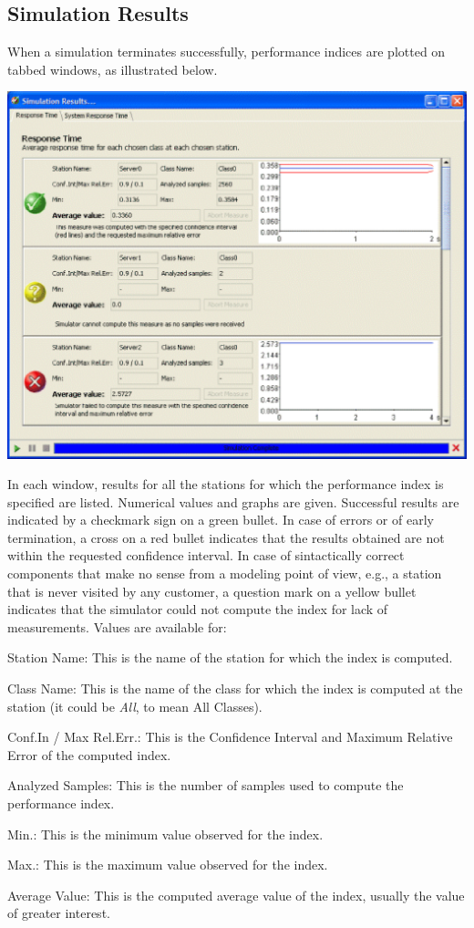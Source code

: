 \begin{description*}
\section{Simulation Results}
\label{sec:SimulationResults}
When a simulation terminates successfully, performance indices are plotted on tabbed windows, as illustrated below.
\begin{center}
\includegraphics[scale=.5]{img/jsim/sim_window.eps}
\end{center}
In each window, results for all the stations for which the performance index is specified are listed. Numerical values and graphs are given.
Successful results are indicated by a checkmark sign on a green bullet.
In case of errors or of early termination, a cross on a red bullet indicates that the results obtained are not within the requested confidence interval.
In case of sintactically correct components that make no sense from a modeling point of view, e.g., a station that is never visited by any customer, a question mark on a yellow bullet indicates that the simulator could not compute the index for lack of measurements.
Values are available for:
\begin{itemize*}
\item Station Name: This is the name of the station for which the index is computed.
\item Class Name: This is the name of the class for which the index is computed at the station (it could be \emph{All}, to mean All Classes).
\item Conf.In / Max Rel.Err.: This is the Confidence Interval and Maximum Relative Error of the computed index.
\item Analyzed Samples: This is the number of samples used to compute the performance index.
\item Min.: This is the minimum value observed for the index.
\item Max.: This is the maximum value observed for the index.
\item Average Value: This is the computed average value of the index, usually the value of greater interest.
\end{itemize*}


\end{description*}
